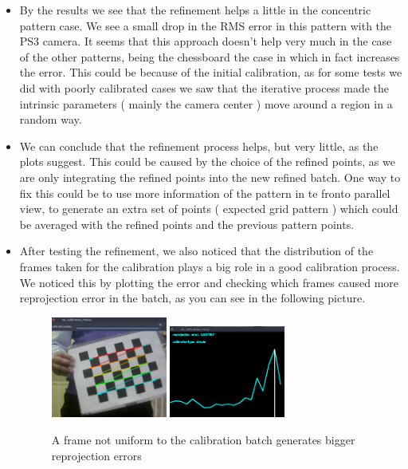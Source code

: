 \documentclass[journal]{IEEEtran}
\begin{document}
\begin{itemize}

    \item By the results we see that the refinement helps a little in the concentric pattern case. We see a small drop in the RMS error in this pattern with the PS3 camera. It seems that this approach doesn't help very much in the case of the other patterns, being the chessboard the case in which in fact increases the error. This could be because of the initial calibration, as for some tests we did with poorly calibrated cases we saw that the iterative process made the intrinsic parameters ( mainly the camera center ) move around a region in a random way.

    \item We can conclude that the refinement process helps, but very little, as the plots suggest. This could be caused by the choice of the refined points, as we are only integrating the refined points into the new refined batch. One way to fix this could be to use more information of the pattern in te fronto parallel view, to generate an extra set of points ( expected grid pattern ) which could be averaged with the refined points and the previous pattern points.

    \item After testing the refinement, we also noticed that the distribution of the frames taken for the calibration plays a big role in a good calibration process. We noticed this by plotting the error and checking which frames caused more reprojection error in the batch, as you can see in the following picture.

    \begin{figure}[H]
    \centering
    \includegraphics[width=1.5in]{_img/report_4/img_issue_frames_distribution_1.png}
    \includegraphics[width=1.5in]{_img/report_4/img_issue_frames_distribution_1_plot.png}
    \caption{A frame not uniform to the calibration batch generates bigger reprojection errors}
    \end{figure}


\end{itemize}
\end{document}
